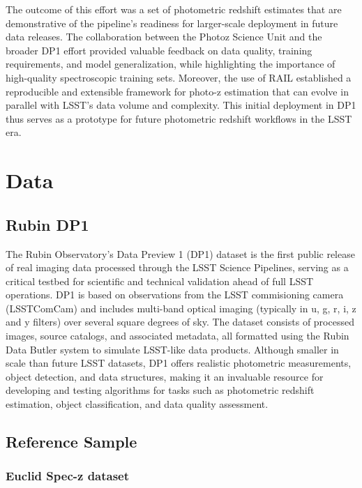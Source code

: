 The outcome of this effort was a set of photometric redshift estimates that are demonstrative of the pipeline's readiness for larger-scale deployment in future data releases.  The collaboration between the Photoz Science Unit and the broader DP1 effort provided valuable feedback on data quality, training requirements, and model generalization, while highlighting the importance of high-quality spectroscopic training sets. Moreover, the use of RAIL established a reproducible and extensible framework for photo-z estimation that can evolve in parallel with LSST’s data volume and complexity. This initial deployment in DP1 thus serves as a prototype for future photometric redshift workflows in the LSST era.

\section{Data}
\label{sec:data:0}

\subsection{Rubin DP1}
\label{sec:data:dp1}

The Rubin Observatory’s Data Preview 1 (DP1) dataset is the first public release of real imaging data processed through the LSST Science Pipelines, serving as a critical testbed for scientific and technical validation ahead of full LSST operations.  DP1 is based on observations from the LSST commisioning camera (LSSTComCam) and includes multi-band optical imaging (typically in u, g, r, i, z and y filters) over several square degrees of sky.  The dataset consists of processed images, source catalogs, and associated metadata, all formatted using the Rubin Data Butler system to simulate LSST-like data products. Although smaller in scale than future LSST datasets, DP1 offers realistic photometric measurements, object detection, and data structures, making it an invaluable resource for developing and testing algorithms for tasks such as photometric redshift estimation, object classification, and data quality assessment.

\subsection{Reference Sample}
\label{sec:data:reference}



\subsubsection{Euclid Spec-z dataset}
\label{sec:data:euclid}


